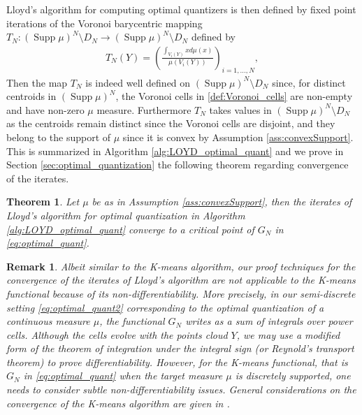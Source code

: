 \documentclass[11pt]{article}
\DeclareMathOperator{\supp}{Supp}
\newcommand{\1}{\mathbbm{1}}
\newtheorem{thm}[lem]{Theorem}
\newtheorem{rem}[lem]{Remark}
\numberwithin{equation}{section}
\begin{document}
Lloyd's algorithm for computing optimal quantizers is then defined by fixed point iterations of the Voronoi barycentric mapping $T_N \colon (\supp\mu)^N \setminus D_N \to (\supp\mu)^N \setminus D_N$ defined by
\begin{align}\label{Lloyd_map}
    T_N(Y) = \left( \frac{\int_{V_{i}(Y)}xd\mu(x)}{\mu(V_{i}(Y))} \right)_{i=1,\ldots,N}, 
\end{align}
Then the map $T_N$ is indeed well defined on $(\supp\mu)^N \setminus D_N$ since, for distinct centroids in $(\supp \mu)^N$, the Voronoi cells in \eqref{def:Voronoi_cells} are non-empty and have non-zero $\mu$ measure. Furthermore $T_N$ takes values in $ (\supp \mu)^N \setminus D_N$ as the centroids remain distinct since the Voronoi cells are disjoint, and they belong to the support of $\mu$ since it is convex by Assumption \ref{ass:convexSupport}.
This is summarized in Algorithm \ref{alg:LOYD_optimal_quant} and we prove in Section \ref{sec:optimal_quantization} the following theorem regarding convergence of the iterates.

\begin{thm}\label{th:main_Optimal_Quant}
	Let $\mu$ be as in Assumption \ref{ass:convexSupport}, then the iterates of Lloyd's algorithm for optimal quantization in Algorithm \ref{alg:LOYD_optimal_quant} converge to a critical point of $G_N$ in \eqref{eq:optimal_quant}.
\end{thm}


\begin{rem}
Albeit similar to the K-means algorithm, our proof techniques for the convergence of the iterates of Lloyd's algorithm are not applicable to the K-means functional because of its non-differentiability. More precisely, in our semi-discrete setting \eqref{eq:optimal_quant2} corresponding to the optimal quantization of a continuous measure $\mu$, the functional $G_N$ writes as a sum of integrals over power cells. Although the cells evolve with the points cloud $Y$, we may use a modified form of the theorem of integration under the integral sign (or Reynold's transport theorem) to prove differentiability. However, for the K-means functional, that is $G_N$ in \eqref{eq:optimal_quant} when the target measure $\mu$ is discretely supported, one needs to consider subtle non-differentiability issues. General considerations on the convergence of the K-means algorithm are given in \cite{bottou1994convergence}.
\end{rem}
\end{document}
